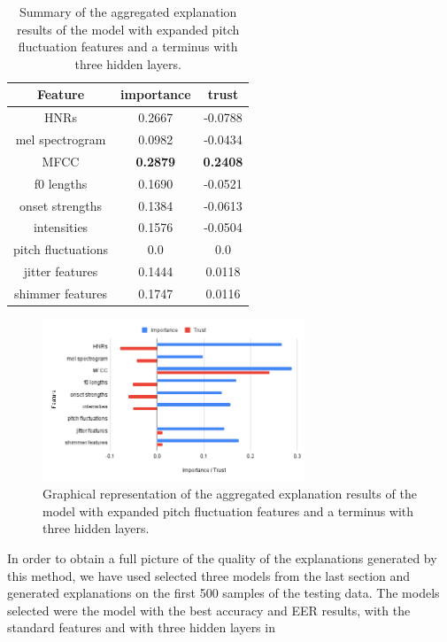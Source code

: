 \documentclass{article}
\begin{document}
		\begin{table}[htbp]
			\caption{Summary of the aggregated explanation results of the model with expanded
			pitch fluctuation features and a terminus with three hidden layers.}
			\vspace{10pt}
			\centering
			\begin{tabular}{c | c | c}
				\hline
				Feature & importance & trust \\
				\hline
				HNRs & 0.2667 & -0.0788 \\
				mel spectrogram & 0.0982 & -0.0434 \\
				MFCC & \textbf{0.2879} & \textbf{0.2408} \\
				f0 lengths & 0.1690 & -0.0521 \\
				onset strengths & 0.1384 & -0.0613 \\
				intensities & 0.1576 & -0.0504 \\
				pitch fluctuations & 0.0 & 0.0 \\
				jitter features & 0.1444 & 0.0118 \\
				shimmer features & 0.1747 & 0.0116
			\end{tabular}
			\label{table:exp-results-mpf-cterm}
		\end{table}
		\begin{figure}
			\centering
			\includegraphics[width=0.7\textwidth]{images/exp_mpf_cterm.png}
			\caption{Graphical representation of the aggregated explanation results of the model
			with expanded pitch fluctuation features and a terminus with three hidden layers.}
			\label{fig:exp_mpf_cterm}
		\end{figure}
		In order to obtain a full picture of the quality of the explanations generated by this
		method, we have used selected three models from the last section and generated explanations
		on the first 500 samples of the testing data. The models selected were the model with the
		best accuracy and EER results, with the standard features and with three hidden layers in
\end{document}
